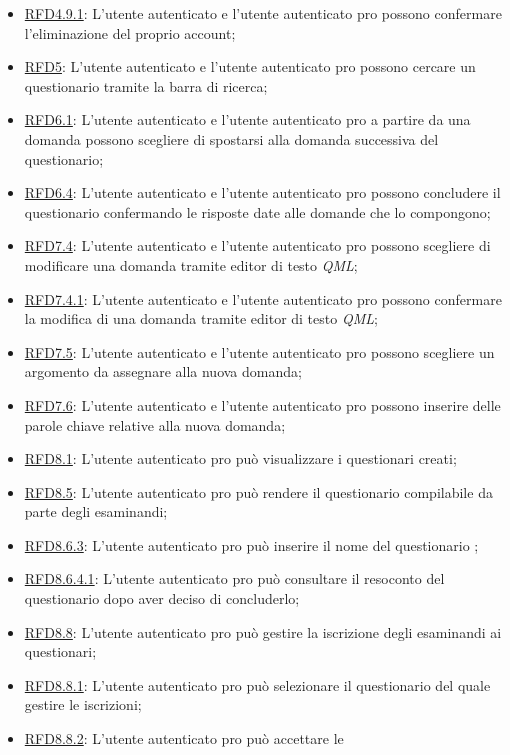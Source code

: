 \begin{itemize}
\item \hyperlink{RFD4.9.1}{RFD4.9.1}: L’utente autenticato e l’utente
autenticato pro possono confermare
l’eliminazione del proprio account;
\item \hyperlink{RFD5}{RFD5}: L’utente autenticato e l’utente
autenticato pro possono cercare un
questionario tramite la barra di ricerca;
\item \hyperlink{RFD6.1}{RFD6.1}: L’utente autenticato e l’utente
autenticato pro a partire da una
domanda possono scegliere di spostarsi
alla domanda successiva del questionario;
\item \hyperlink{RFD6.4}{RFD6.4}: L’utente autenticato e l’utente
autenticato pro possono concludere il
questionario confermando le risposte date
alle domande che lo compongono;
\item \hyperlink{RFD7.4}{RFD7.4}: L’utente autenticato e l’utente autenticato pro possono scegliere di modificare una domanda tramite editor di testo \textit{QML};
\item \hyperlink{RFD7.4.1}{RFD7.4.1}: L’utente autenticato e l’utente autenticato pro possono confermare la modifica di una domanda tramite editor di testo \textit{QML};
\item \hyperlink{RFD7.5}{RFD7.5}: L’utente autenticato e l’utente
autenticato pro possono scegliere un
argomento da assegnare alla nuova
domanda;
\item \hyperlink{RFD7.6}{RFD7.6}: L’utente autenticato e l’utente
autenticato pro possono inserire delle
parole chiave relative alla nuova domanda;
\item \hyperlink{RFD8.1}{RFD8.1}: L’utente autenticato pro può visualizzare
i questionari creati;
\item \hyperlink{RFD8.5}{RFD8.5}: L’utente autenticato pro può rendere il
questionario compilabile da parte degli
esaminandi;
\item \hyperlink{RFD8.6.3}{RFD8.6.3}: L’utente autenticato pro può inserire il
nome del questionario ;
\item \hyperlink{RFD8.6.4.1}{RFD8.6.4.1}: L’utente autenticato pro può consultare il
resoconto del questionario dopo aver
deciso di concluderlo;
\item \hyperlink{RFD8.8}{RFD8.8}: L’utente autenticato pro può gestire la
iscrizione degli esaminandi ai questionari;
\item \hyperlink{RFD8.8.1}{RFD8.8.1}: L’utente autenticato pro può selezionare
il questionario del quale gestire le
iscrizioni;
\item \hyperlink{RFD8.8.2}{RFD8.8.2}: L’utente autenticato pro può accettare le

\end{itemize}
